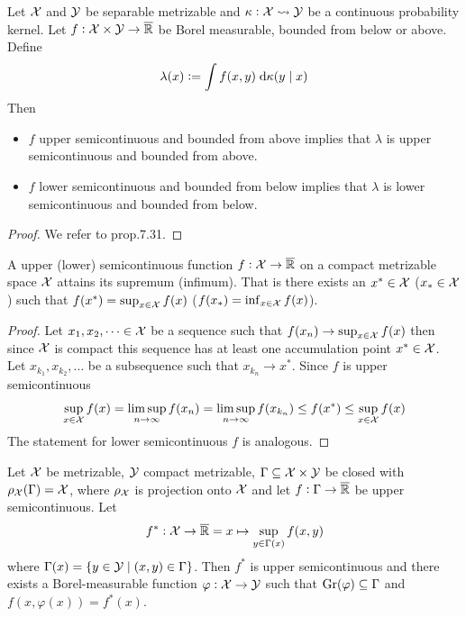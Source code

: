 \begin{prop}
  Let $\mathcal{X}$ and $\mathcal{Y}$ be separable metrizable and
  $\kappa : \mathcal{X} \leadsto \mathcal{Y}$ be a continuous probability
  kernel. Let $f : \mathcal{X} \times \mathcal{Y} \to \overline{\mathbb{R}}$ be Borel measurable,
  bounded from below or above. Define
  \[ \lambda(x) \vcentcolon= \int f(x, y) \; \mathrm{d} \kappa(y \mid x) \]
  Then
  \begin{itemize}
    \item $f$ upper semicontinuous and bounded from above implies that
      $\lambda$ is upper semicontinuous and bounded from above.
    \item $f$ lower semicontinuous and bounded from below implies that
      $\lambda$ is lower semicontinuous and bounded from below.
  \end{itemize}
  \label{prop:intSemiC}
\end{prop}
\begin{proof}
  We refer to  prop.7.31.
\end{proof}

\begin{prop}
  A upper (lower) semicontinuous function $f: \mathcal{X} \to \overline{\mathbb{R}}$ on a compact
  metrizable space $\mathcal{X}$ attains its
  supremum (infimum). That is there exists an $x^* \in \mathcal{X}$ 
  ($x_* \in \mathcal{X}$) such that
  $f(x^*) = \sup_{x \in \mathcal{X}} f(x)$
  ($f(x_*) = \inf_{x \in \mathcal{X}} f(x)$).
  \label{prop:supSemiC}
\end{prop}
\begin{proof}
  Let $x_1, x_2, \dots \in \mathcal{X}$ be a sequence such that
  $f(x_n) \to \sup_{x \in \mathcal{X}} f(x)$ then since $\mathcal{X}$ is compact
  this sequence has at least one accumulation point $x^* \in \mathcal{X}$.
  Let $x_{k_1}, x_{k_2}, \dots$ be a subsequence such that $x_{k_n} \to x^*$.
  Since $f$ is upper semicontinuous
  \[ \sup_{x \in \mathcal{X}} f(x) = \limsup_{n \to \infty} f(x_n)
    = \limsup_{n \to \infty} f(x_{k_n}) \leq f(x^*)
  \leq \sup_{x \in \mathcal{X}} f(x) \]
  The statement for lower semicontinuous $f$ is analogous.
\end{proof}

\begin{prop}
  Let $\mathcal{X}$ be metrizable, $\mathcal{Y}$ compact metrizable,
  $\Gamma \subseteq \mathcal{X} \times \mathcal{Y}$ be closed with
  $\rho_\mathcal{X} (\Gamma) = \mathcal{X}$, where
  $\rho_\mathcal{X}$ is projection onto $\mathcal{X}$
  and let $f : \Gamma \to \overline{\mathbb{R}}$ be upper semicontinuous. Let
  \[ f^* : \mathcal{X} \to \overline{\mathbb{R}} = x \mapsto \sup_{y \in \Gamma(x)} f(x, y) \]
  where $\Gamma(x) = \{ y \in \mathcal{Y} \mid (x, y) \in \Gamma \}$.
  Then $f^*$ is upper semicontinuous and there exists a Borel-measurable
  function $\varphi : \mathcal{X} \to \mathcal{Y}$ such that
  $\mathrm{Gr}(\varphi) \subseteq \Gamma$ and
  $f(x, \varphi(x)) = f^*(x)$.
  \label{prop:measSel}
\end{prop}

